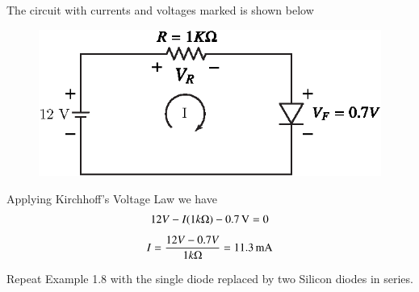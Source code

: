 \begin{solution}
The circuit with currents and voltages marked is shown below
\begin{figure}[H]
\centering
\includegraphics{chap1/S3-EE-01-020.eps}
\end{figure}

Applying Kirchhoff's Voltage Law we have 
\begin{gather*}
12 V - I (1 k \Omega) - 0.7\text{\,V} =0\\[4pt]
I = \frac{12 V - 0.7 V}{1 k \Omega}=11.3\text{\,mA}
\end{gather*}
\vskip -1cm
\end{solution}

\eject


\begin{example}\label{exam1.9}
Repeat Example 1.8 with the single diode replaced by two Silicon
diodes in series. 
\end{example}


